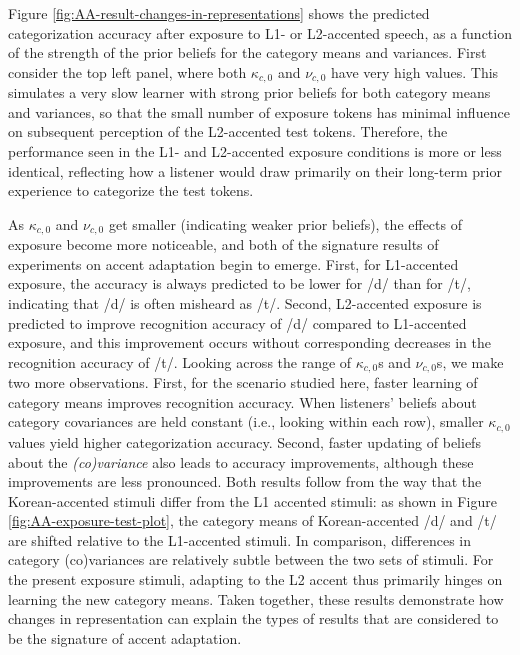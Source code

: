 \documentclass[
  11pt,
  man,floatsintext]{apa6}
\begin{document}
Figure \ref{fig:AA-result-changes-in-representations} shows the predicted categorization accuracy after exposure to L1- or L2-accented speech, as a function of the strength of the prior beliefs for the category means and variances. First consider the top left panel, where both \(\kappa_{c,0}\) and \(\nu_{c,0}\) have very high values. This simulates a very slow learner with strong prior beliefs for both category means and variances, so that the small number of exposure tokens has minimal influence on subsequent perception of the L2-accented test tokens. Therefore, the performance seen in the L1- and L2-accented exposure conditions is more or less identical, reflecting how a listener would draw primarily on their long-term prior experience to categorize the test tokens.

As \(\kappa_{c,0}\) and \(\nu_{c,0}\) get smaller (indicating weaker prior beliefs), the effects of exposure become more noticeable, and both of the signature results of experiments on accent adaptation begin to emerge. First, for L1-accented exposure, the accuracy is always predicted to be lower for /d/ than for /t/, indicating that /d/ is often misheard as /t/. Second, L2-accented exposure is predicted to improve recognition accuracy of /d/ compared to L1-accented exposure, and this improvement occurs without corresponding decreases in the recognition accuracy of /t/. Looking across the range of \(\kappa_{c,0}\)s and \(\nu_{c,0}\)s, we make two more observations. First, for the scenario studied here, faster learning of category means improves recognition accuracy. When listeners' beliefs about category covariances are held constant (i.e., looking within each row), smaller \(\kappa_{c,0}\) values yield higher categorization accuracy. Second, faster updating of beliefs about the \emph{(co)variance} also leads to accuracy improvements, although these improvements are less pronounced. Both results follow from the way that the Korean-accented stimuli differ from the L1 accented stimuli: as shown in Figure \ref{fig:AA-exposure-test-plot}, the category means of Korean-accented /d/ and /t/ are shifted relative to the L1-accented stimuli. In comparison, differences in category (co)variances are relatively subtle between the two sets of stimuli. For the present exposure stimuli, adapting to the L2 accent thus primarily hinges on learning the new category means. Taken together, these results demonstrate how changes in representation can explain the types of results that are considered to be the signature of accent adaptation.
\end{document}
